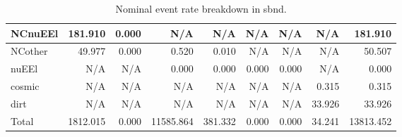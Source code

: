 \begin{table}
\begin{adjustbox}{width=1\textwidth}
\begin{tabular} {  l r  r  r  r  r  r  r  r  }
        \\ \hline
 NCnuEEl      & 181.910              & 0.000                & N/A                  & N/A                  & N/A                  & N/A                  & N/A                  & 181.910      
        \\ \hline
 NCother      & 49.977               & 0.000                & 0.520                & 0.010                & N/A                  & N/A                  & N/A                  & 50.507       
        \\ \hline
 nuEEl        & N/A                  & N/A                  & 0.000                & 0.000                & 0.000                & 0.000                & N/A                  & 0.000        
        \\ \hline
 cosmic       & N/A                  & N/A                  & N/A                  & N/A                  & N/A                  & N/A                  & 0.315                & 0.315        
        \\ \hline
 dirt         & N/A                  & N/A                  & N/A                  & N/A                  & N/A                  & N/A                  & 33.926               & 33.926       
        \\ \hline
\hline
 Total        & 1812.015             & 0.000                & 11585.864            & 381.332              & 0.000                & 0.000                & 34.241               & 13813.452    
        \\ \hline

\end{tabular}
\end{adjustbox}

\caption[Nominal \nue event rate breakdown in \gls{sbnd}.]{Nominal \nue event rate breakdown in \gls{sbnd}.}
\label{table:sbnd_nue_event_rate}
\end{table}


